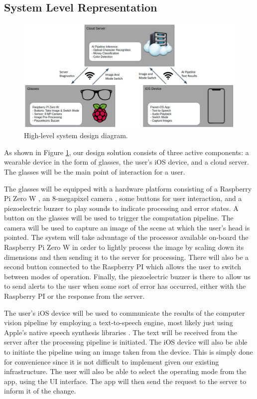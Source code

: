 \documentclass[a4paper,11pt]{article}
\begin{document}
\subsection{System Level Representation}
\label{section-system-level}

\begin{figure}[H]
\centering
\includegraphics[scale=0.4]{img/system_diagram.png}
\caption{High-level system design diagram.}
\label{fig:system_diagram}
\end{figure}

As shown in Figure \ref{fig:system_diagram}, our design solution consists of three active components: a wearable device in the form of glasses, the user's iOS device, and a cloud server. The glasses will be the main point of interaction for a user.

The glasses will be equipped with a hardware platform consisting of a Raspberry Pi Zero W \cite{rpi-zero-w}, an 8-megapixel camera \cite{rpi-camera}, some buttons for user interaction, and a piezoelectric buzzer to play sounds to indicate processing and error states. A button on the glasses will be used to trigger the computation pipeline. The camera will be used to capture an image of the scene at which the user's head is pointed. The system will take advantage of the processor available on-board the Raspberry Pi Zero W in order to lightly process the image by scaling down its dimensions and then sending it to the server for processing. There will also be a second button connected to the Raspberry PI which allows the user to switch between modes of operation. Finally, the piezoelectric buzzer is there to allow us to send alerts to the user when some sort of error has occurred, either with the Raspberry PI or the response from the server.

The user's iOS device will be used to communicate the results of the computer vision pipeline by employing a text-to-speech engine, most likely just using Apple's native speech synthesis libraries \cite{apple-speech-synthesis}. The text will be received from the server after the processing pipeline is initiated. The iOS device will also be able to initiate the pipeline using an image taken from the device. This is simply done for convenience since it is not difficult to implement given our existing infrastructure. The user will also be able to select the operating mode from the app, using the UI interface. The app will then send the request to the server to inform it of the change. 
\end{document}
